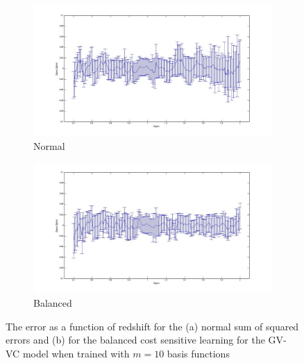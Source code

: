 \documentclass[useAMS,usenatbib,fleqn]{mn2e}
\begin{document}
\begin{figure}
        \centering
        \begin{subfigure}[b]{1\columnwidth}
                \includegraphics[trim = 35px 15px 50px 25px, clip=true,width=\textwidth]{figures/Zspec-Zphot_normal.jpg}
                \caption{Normal}
                \label{fig-normal}
        \end{subfigure}
	
        \begin{subfigure}[b]{1\columnwidth}
                \includegraphics[trim = 35px 15px 50px 25px, clip=true,width=\textwidth]{figures/Zspec-Zphot_balanced.jpg}
                \caption{Balanced}
                \label{fig-balanced}
        \end{subfigure}
        
       \caption{The error as a function of redshift for the (a) normal sum of squared errors and (b) for the balanced cost sensitive learning for the GV-VC model when trained with $m=10$ basis functions}
	\label{fig-normal-balanced}
\end{figure}
\end{document}
